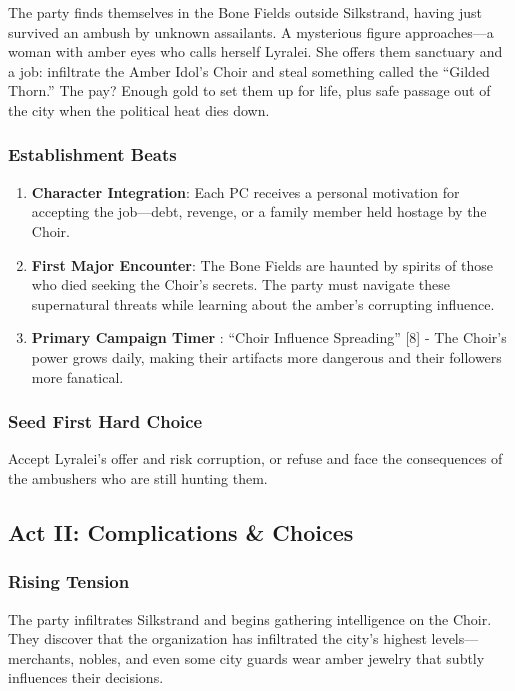 \documentclass[11pt]{article}
\begin{document}
The party finds themselves in the Bone Fields outside Silkstrand, having just survived an ambush by unknown assailants. A mysterious figure approaches---a woman with amber eyes who calls herself Lyralei. She offers them sanctuary and a job: infiltrate the Amber Idol's Choir and steal something called the ``Gilded Thorn.'' The pay? Enough gold to set them up for life, plus safe passage out of the city when the political heat dies down.

\subsubsection*{Establishment Beats}

\begin{enumerate}
  \item \textbf{Character Integration}: Each PC receives a personal motivation for accepting the job---debt, revenge, or a family member held hostage by the Choir.
  \item \textbf{First Major Encounter}: The Bone Fields are haunted by spirits of those who died seeking the Choir's secrets. The party must navigate these supernatural threats while learning about the amber's corrupting influence.
  \item \textbf{Primary Campaign Timer }: ``Choir Influence Spreading'' [8] - The Choir's power grows daily, making their artifacts more dangerous and their followers more fanatical.
\end{enumerate}

\subsubsection*{Seed First Hard Choice}

Accept Lyralei's offer and risk corruption, or refuse and face the consequences of the ambushers who are still hunting them.

\subsection*{Act II: Complications \& Choices}

\subsubsection*{Rising Tension}

The party infiltrates Silkstrand and begins gathering intelligence on the Choir. They discover that the organization has infiltrated the city's highest levels---merchants, nobles, and even some city guards wear amber jewelry that subtly influences their decisions.
\end{document}
